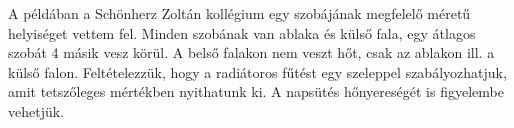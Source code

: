 





\begin{table}[H]
	\footnotesize
	\centering
	\caption{Egy szoba határoló felületei és azok termikus tulajdonságai}
	\renewcommand{\arraystretch}{2} %
	
	
	
	

	\label{table_house_parameters}
	
	
\end{table}

 A példában a Schönherz Zoltán kollégium egy szobájának megfelelő méretű helyiséget vettem fel. Minden szobának van ablaka és külső fala, egy átlagos szobát 4 másik vesz körül. A belső falakon nem veszt hőt, csak az ablakon ill. a külső falon. Feltételezzük, hogy a radiátoros fűtést egy szeleppel szabályozhatjuk, amit tetszőleges mértékben nyithatunk ki.
 A napsütés hőnyereségét is figyelembe vehetjük.%


